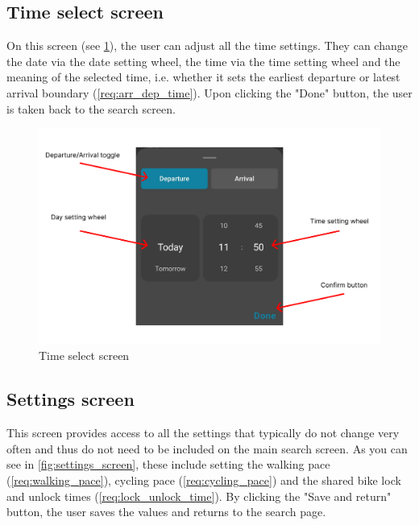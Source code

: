 \newpage


\subsection{Time select screen}

On this screen (see \cref{fig:time_select}), the user can adjust all the time settings. They can change the date via the date setting wheel, the time via the time setting wheel and the meaning of the selected time, i.e. whether it sets the earliest departure or latest arrival boundary (\cref{req:arr_dep_time}). Upon clicking the "Done" button, the user is taken back to the search screen.

\begin{figure}[h!]
    \centering
    \includegraphics[width=\textwidth]{img/ui_descriptions/time_settings.pdf}
    \caption{Time select screen}
    \label{fig:time_select}
\end{figure}

\newpage

\subsection{Settings screen}

This screen provides access to all the settings that typically do not change very often and thus do not need to be included on the main search screen. As you can see in \cref{fig:settings_screen}, these include setting the walking pace (\cref{req:walking_pace}), cycling pace (\cref{req:cycling_pace}) and the shared bike lock and unlock times (\cref{req:lock_unlock_time}). By clicking the "Save and return" button, the user saves the values and returns to the search page.


